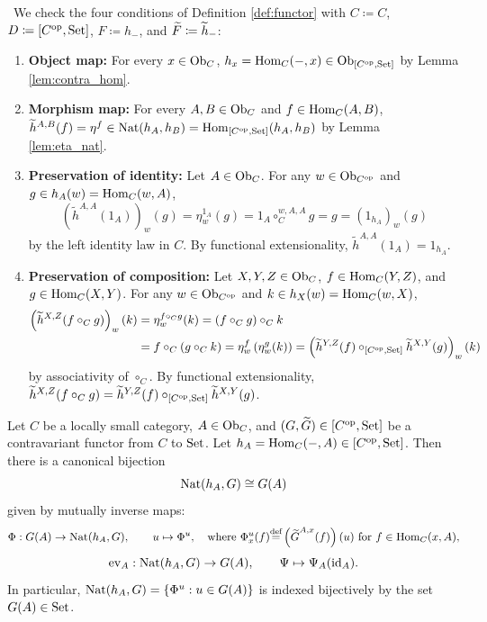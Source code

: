 \documentclass[10pt,a4paper]{article}
\begin{document}
\myprf\ We check the four conditions of Definition \ref{def:functor} with $C \coloneqq C$, $D \coloneqq [C^{\textrm{op}},{\textrm{Set}}]$, $F \coloneqq h_-$, and ${\widetilde{F}\textrm{}} \coloneqq \widetilde{h}_-$:
\begin{enumerate}
\item \textbf{Object map:} For every $x \in {\textrm{Ob}}_C$, $h_x = {\textrm{Hom}}_C(-,x) \in {\textrm{Ob}}_{[C^{\textrm{op}},{\textrm{Set}}]}$ by Lemma \ref{lem:contra_hom}.
\item \textbf{Morphism map:} For every $A,B \in {\textrm{Ob}}_C$ and $f \in {\textrm{Hom}}_C(A,B)$, $\widetilde{h}^{A,B}(f) = \eta^f \in {\textrm{Nat}}(h_A, h_B) = {\textrm{Hom}}_{[C^{\textrm{op}},{\textrm{Set}}]}(h_A, h_B)$ by Lemma \ref{lem:eta_nat}.
\item \textbf{Preservation of identity:} Let $A \in {\textrm{Ob}}_C$. For any $w \in {\textrm{Ob}}_{C^{\textrm{op}}}$ and $g \in h_A(w) = {\textrm{Hom}}_C(w,A)$,
$$\left(\widetilde{h}^{A,A}(1_A)\right)_w(g) = \eta^{1_A}_w(g) = 1_A \circ_C^{w,A,A} g = g = \left(1_{h_A}\right)_w(g)$$
by the left identity law in $C$. By functional extensionality, $\widetilde{h}^{A,A}(1_A) = 1_{h_A}$.
\item \textbf{Preservation of composition:} Let $X,Y,Z \in {\textrm{Ob}}_C$, $f \in {\textrm{Hom}}_C(Y,Z)$, and $g \in {\textrm{Hom}}_C(X,Y)$. For any $w \in {\textrm{Ob}}_{C^{\textrm{op}}}$ and $k \in h_X(w) = {\textrm{Hom}}_C(w,X)$,
\begin{align*}
\left(\widetilde{h}^{X,Z}(f \circ_C g)\right)_w(k) &= \eta^{f \circ_C g}_w(k) = (f \circ_C g) \circ_C k \\
&= f \circ_C (g \circ_C k) = \eta^f_w\left(\eta^g_w(k)\right) = \left(\widetilde{h}^{Y,Z}(f) \circ_{[C^{\textrm{op}},{\textrm{Set}}]} \widetilde{h}^{X,Y}(g)\right)_w(k)
\end{align*}
by associativity of $\circ_C$. By functional extensionality, $\widetilde{h}^{X,Z}(f \circ_C g) = \widetilde{h}^{Y,Z}(f) \circ_{[C^{\textrm{op}},{\textrm{Set}}]} \widetilde{h}^{X,Y}(g)$.
\end{enumerate}
\myqed
\begin{theorem}\label{thm:yoneda_contra}
Let $C$ be a locally small category, $A \in {\textrm{Ob}}_C$, and $(G, {\widetilde{G}\textrm{}}) \in [C^{\textrm{op}}, {\textrm{Set}}]$ be a contravariant functor from $C$ to ${\textrm{Set}}$. Let $h_A = {\textrm{Hom}}_C(-,A) \in [C^{\textrm{op}}, {\textrm{Set}}]$. Then there is a canonical bijection
$${\textrm{Nat}}(h_A, G) \cong G(A)$$
given by mutually inverse maps:
$$\Phi : G(A) \to {\textrm{Nat}}(h_A, G), \qquad u \mapsto \Phi^u, \quad \textrm{where } \Phi^u_x(f) {\stackrel{{\textrm{def}}}{=}} \left({\widetilde{G}\textrm{}}^{A,x}(f)\right)(u) \textrm{ for } f \in {\textrm{Hom}}_C(x,A),$$
$$\mathrm{ev}_A : {\textrm{Nat}}(h_A, G) \to G(A), \qquad \Psi \mapsto \Psi_A({\textrm{id}}_A).$$
In particular, ${\textrm{Nat}}(h_A, G) = \{\Phi^u : u \in G(A)\}$ is indexed bijectively by the set $G(A) \in {\textrm{Set}}$.
\end{theorem}
\end{document}
